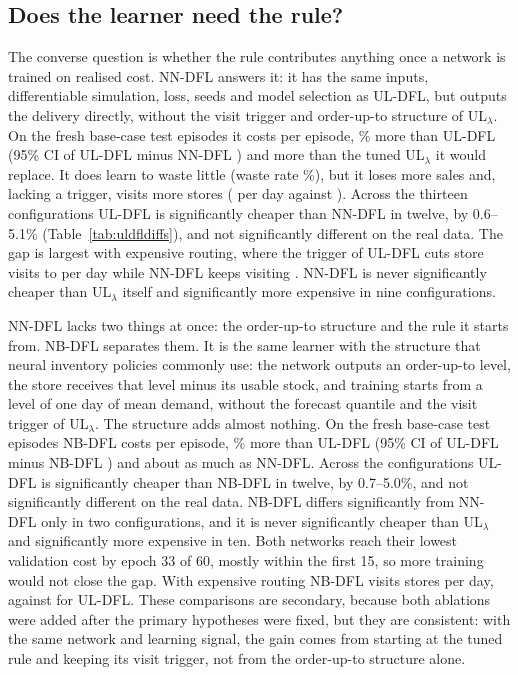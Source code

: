 \subsection{Does the learner need the rule?}\label{sec:nndfl}

The converse question is whether the rule contributes anything once a network is trained on realised cost. NN-DFL answers it: it has the same inputs, differentiable simulation, loss, seeds and model selection as UL-DFL, but outputs the delivery directly, without the visit trigger and order-up-to structure of UL$_\lambda$. On the fresh base-case test episodes it costs \costNNDFLBaseFresh{} per episode, \ULabsrelNNDFLBaseFresh\% more than UL-DFL (95\% CI of UL-DFL minus NN-DFL \ULciNNDFLBaseFresh{}) and more than the tuned UL$_\lambda$ it would replace. It does learn to waste little (waste rate \wasteNNDFLBaseFresh\%), but it loses more sales and, lacking a trigger, visits more stores (\visitsNNDFLBaseFresh{} per day against \visitsULDFLBaseFresh{}). Across the thirteen configurations UL-DFL is significantly cheaper than NN-DFL in twelve, by 0.6--5.1\% (Table~\ref{tab:uldfldiffs}), and not significantly different on the real data. The gap is largest with expensive routing, where the trigger of UL-DFL cuts store visits to \visitsULDFLRouteThree{} per day while NN-DFL keeps visiting \visitsNNDFLRouteThree{}. NN-DFL is never significantly cheaper than UL$_\lambda$ itself and significantly more expensive in nine configurations.

NN-DFL lacks two things at once: the order-up-to structure and the rule it starts from. NB-DFL separates them. It is the same learner with the structure that neural inventory policies commonly use: the network outputs an order-up-to level, the store receives that level minus its usable stock, and training starts from a level of one day of mean demand, without the forecast quantile and the visit trigger of UL$_\lambda$. The structure adds almost nothing. On the fresh base-case test episodes NB-DFL costs \costNBDFLBaseFresh{} per episode, \ULabsrelNBDFLBaseFresh\% more than UL-DFL (95\% CI of UL-DFL minus NB-DFL \ULciNBDFLBaseFresh{}) and about as much as NN-DFL. Across the configurations UL-DFL is significantly cheaper than NB-DFL in twelve, by 0.7--5.0\%, and not significantly different on the real data. NB-DFL differs significantly from NN-DFL only in two configurations, and it is never significantly cheaper than UL$_\lambda$ and significantly more expensive in ten. Both networks reach their lowest validation cost by epoch 33 of 60, mostly within the first 15, so more training would not close the gap. With expensive routing NB-DFL visits \visitsNBDFLRouteThree{} stores per day, against \visitsULDFLRouteThree{} for UL-DFL. These comparisons are secondary, because both ablations were added after the primary hypotheses were fixed, but they are consistent: with the same network and learning signal, the gain comes from starting at the tuned rule and keeping its visit trigger, not from the order-up-to structure alone.

